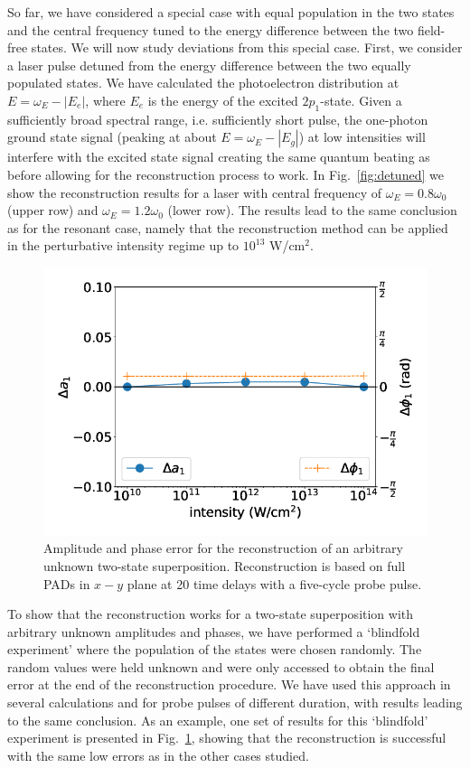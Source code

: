 So far, we have considered a special case with equal population in the two states and the central frequency tuned to the energy difference between the two field-free states. We will now study deviations from this special case. First, we consider a laser pulse detuned from the energy difference between the two equally populated states. We have calculated the photoelectron distribution at $E=\omega_E-|E_e|$, where $E_e$ is the energy of the excited $2p_1$-state. Given a sufficiently broad spectral range, i.e. sufficiently short pulse, the one-photon ground state signal (peaking at about $E = \omega_E-|E_g|$) at low intensities will interfere with the excited state signal creating the same quantum beating as before allowing for the reconstruction process to work. In Fig.~\ref{fig:detuned} we show the reconstruction results for a laser with central frequency of $\omega_E = 0.8\omega_0$ (upper row) and $\omega_E = 1.2\omega_0$ (lower row). 
The results lead to the same conclusion as for the resonant case, namely that the reconstruction method can be applied in the perturbative intensity regime up to $10^{13}$ W/cm$^2$.

\begin{figure}[!ht]
\centering
\includegraphics[width=0.5\linewidth]{figs/Photo_ionization/superpositions/Venzke_new_fig_7.png}
\caption{
Amplitude and phase error for the reconstruction of an arbitrary unknown two-state superposition. Reconstruction is based on full PADs in $x-y$ plane at 20 time delays with a five-cycle probe pulse. 
} 
  \label{fig:random_state}
\end{figure}

To show that the reconstruction works for a two-state superposition with arbitrary unknown amplitudes and phases, we have performed a `blindfold experiment' where the population of the states were chosen randomly. The random values were held unknown and were only accessed to obtain the final error at the end of the reconstruction procedure. We have used this approach in several calculations and for probe pulses of different duration, with results
leading to the same conclusion. As an example, one set of results for this `blindfold' experiment is presented in Fig.~\ref{fig:random_state}, showing that the reconstruction is successful with the same low errors as in the other cases studied.

